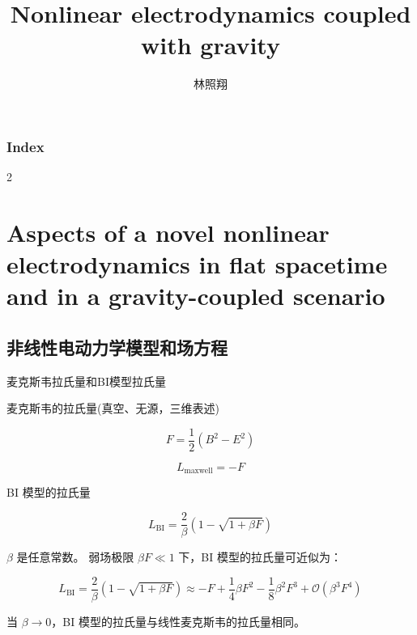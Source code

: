 \documentclass[9pt, dvipsnames]{beamer} %
\title{Nonlinear electrodynamics coupled with gravity } %
\author[林照翔]{林照翔} %
\date{} %
\begin{document}
\everymath{\displaystyle}

\begin{frame}
    \titlepage %
\end{frame}

\begin{frame}
    \frametitle{\textbf{Index}}
    \begin{multicols}{2}
    \tableofcontents
    \end{multicols}
\end{frame}



\section{Aspects of a novel nonlinear electrodynamics in flat spacetime and in a gravity-coupled scenario}

\subsection{非线性电动力学模型和场方程}

\begin{frame}{麦克斯韦拉氏量和BI模型拉氏量}

麦克斯韦的拉氏量(真空、无源，三维表述)

$$
F
=\frac{1 }{2 } (B^2-E^2)
$$

$$
L_{\mathrm{maxwell}}
=-F
$$

BI 模型的拉氏量

$$
L_{\mathrm{BI}}
=\frac{2 }{\beta } \left(1-\sqrt{1+\beta F} \right) 
$$

$\beta $ 是任意常数。   弱场极限 $\beta F\ll 1 $ 下，BI 模型的拉氏量可近似为：

$$
L_{\mathrm{BI}}
=\frac{2 }{\beta } \left(1-\sqrt{1+\beta F} \right)
\approx -F + \frac{1 }{4 } \beta F^2 - \frac{1 }{8 } \beta^2 F^3 +\mathcal{O}\left(\beta^3 F^4 \right) 
$$

当 $\beta\to 0 $，BI 模型的拉氏量与线性麦克斯韦的拉氏量相同。

\end{frame}
\end{document}
